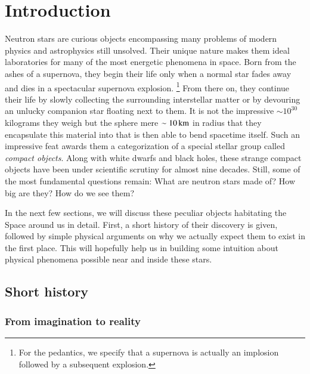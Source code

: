 \chapter{Introduction} 

Neutron stars are curious objects encompassing many problems of modern physics and astrophysics still unsolved.
Their unique nature makes them ideal laboratories for many of the most energetic phenomena in space.
Born from the ashes of a supernova, they begin their life only when a normal star fades away and dies in a spectacular supernova explosion.%
\footnote{ For the pedantics, we specify that a supernova is actually an implosion followed by a subsequent explosion.}
From there on, they continue their life by slowly collecting the surrounding interstellar matter or by devouring an unlucky companion star floating next to them.
It is not the impressive $\sim 10^{30}$ kilograms they weigh but the sphere mere $\sim 10 \, \mathrm{km}$ in radius that they encapsulate this material into that is then able to bend spacetime itself.
Such an impressive feat awards them a categorization of a special stellar group called \textit{compact objects}.
Along with white dwarfs and black holes, these strange compact objects have been under scientific scrutiny for almost nine decades.
Still, some of the most fundamental questions remain:
What are neutron stars made of?
How big are they?
How do we see them?

In the next few sections, we will discuss these peculiar objects habitating the Space around us in detail.
First, a short history of their discovery is given, followed by simple physical arguments on why we actually expect them to exist in the first place.
This will hopefully help us in building some intuition about physical phenomena possible near and inside these stars.


\section{Short history}
\subsection{From imagination to reality}

